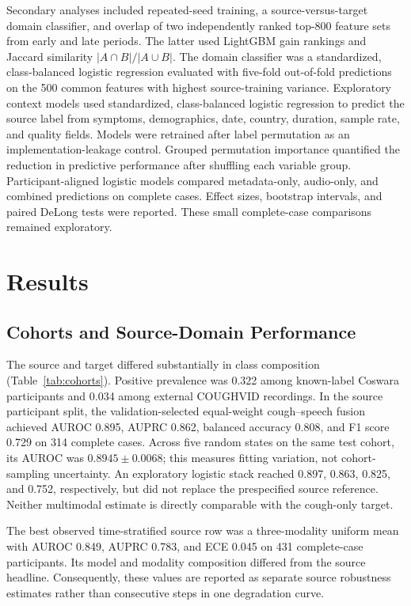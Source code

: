\documentclass[journal]{IEEEtran}
\begin{document}
Secondary analyses included repeated-seed training, a source-versus-target domain classifier, and overlap of two independently ranked top-800 feature sets from early and late periods. The latter used LightGBM gain rankings and Jaccard similarity $|A\cap B|/|A\cup B|$. The domain classifier was a standardized, class-balanced logistic regression evaluated with five-fold out-of-fold predictions on the 500 common features with highest source-training variance. Exploratory context models used standardized, class-balanced logistic regression to predict the source label from symptoms, demographics, date, country, duration, sample rate, and quality fields. Models were retrained after label permutation as an implementation-leakage control. Grouped permutation importance quantified the reduction in predictive performance after shuffling each variable group. Participant-aligned logistic models compared metadata-only, audio-only, and combined predictions on complete cases. Effect sizes, bootstrap intervals, and paired DeLong tests were reported. These small complete-case comparisons remained exploratory.

\section{Results}

\subsection{Cohorts and Source-Domain Performance}

The source and target differed substantially in class composition (Table~\ref{tab:cohorts}). Positive prevalence was 0.322 among known-label Coswara participants and 0.034 among external COUGHVID recordings. In the source participant split, the validation-selected equal-weight cough--speech fusion achieved AUROC 0.895, AUPRC 0.862, balanced accuracy 0.808, and F1 score 0.729 on 314 complete cases. Across five random states on the same test cohort, its AUROC was $0.8945\pm0.0068$; this measures fitting variation, not cohort-sampling uncertainty. An exploratory logistic stack reached 0.897, 0.863, 0.825, and 0.752, respectively, but did not replace the prespecified source reference. Neither multimodal estimate is directly comparable with the cough-only target.

The best observed time-stratified source row was a three-modality uniform mean with AUROC 0.849, AUPRC 0.783, and ECE 0.045 on 431 complete-case participants. Its model and modality composition differed from the source headline. Consequently, these values are reported as separate source robustness estimates rather than consecutive steps in one degradation curve.
\end{document}
